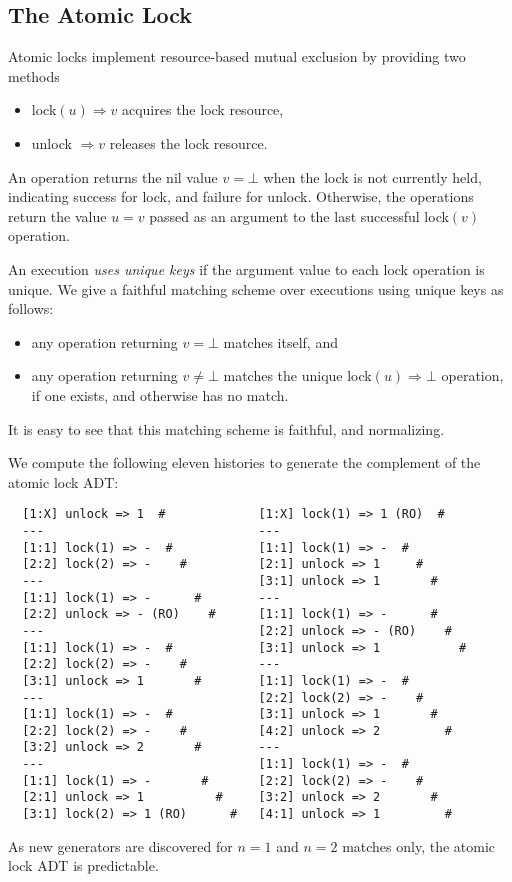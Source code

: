 \subsection{The Atomic Lock}

Atomic locks implement resource-based mutual exclusion by providing two
methods
\begin{itemize}

  \item lock$(u) \Rightarrow v$ acquires the lock resource,

  \item unlock $\Rightarrow v$ releases the lock resource.

\end{itemize}
An operation returns the nil value $v = \mathord\perp$ when the lock is not
currently held, indicating success for lock, and failure for unlock. Otherwise,
the operations return the value $u = v$ passed as an argument to the last
successful lock$(v)$ operation.

An execution \emph{uses unique keys} if the argument value to each lock
operation is unique. We give a faithful matching scheme over executions using
unique keys as follows:
\begin{itemize}

  \item any operation returning $v = \mathord\perp$ matches itself, and

  \item any operation returning $v \neq \mathord\perp$ matches the unique
  lock$(u) \Rightarrow \mathord\perp$ operation, if one exists, and otherwise
  has no match.

\end{itemize}
It is easy to see that this matching scheme is faithful, and normalizing.

We compute the following eleven histories to generate the complement of the
atomic lock ADT:
\begin{verbatim}
  [1:X] unlock => 1  #             [1:X] lock(1) => 1 (RO)  #
  ---                              ---
  [1:1] lock(1) => -  #            [1:1] lock(1) => -  #
  [2:2] lock(2) => -    #          [2:1] unlock => 1     #
  ---                              [3:1] unlock => 1       #
  [1:1] lock(1) => -      #        ---
  [2:2] unlock => - (RO)    #      [1:1] lock(1) => -      #
  ---                              [2:2] unlock => - (RO)    #
  [1:1] lock(1) => -  #            [3:1] unlock => 1           #
  [2:2] lock(2) => -    #          ---
  [3:1] unlock => 1       #        [1:1] lock(1) => -  #
  ---                              [2:2] lock(2) => -    #
  [1:1] lock(1) => -  #            [3:1] unlock => 1       #
  [2:2] lock(2) => -    #          [4:2] unlock => 2         #
  [3:2] unlock => 2       #        ---
  ---                              [1:1] lock(1) => -  #
  [1:1] lock(1) => -       #       [2:2] lock(2) => -    #
  [2:1] unlock => 1          #     [3:2] unlock => 2       #
  [3:1] lock(2) => 1 (RO)      #   [4:1] unlock => 1         #
\end{verbatim}
As new generators are discovered for $n=1$ and $n=2$ matches only, the atomic
lock ADT is predictable.

